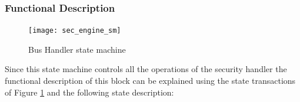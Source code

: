 \subsubsection{Functional Description}

\begin{figure}[!ht]
	\centering
	\texttt{[image: sec\_engine\_sm]}
    \caption{Bus Handler state machine  }
	\label{fig:phsm}
\end{figure}
Since this  state machine controls all the operations of the security handler the functional 
description of this block can be explained using the state transactions of Figure \ref{fig:phsm} and the 
following state description:

